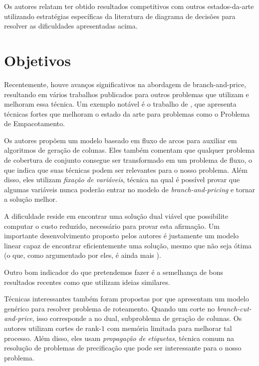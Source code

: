 \documentclass[11pt]{article}
\providecommand{\DIFaddtex}[1]{{\protect\color{blue}{#1}}} %
\providecommand{\DIFaddbegin}{} %
\providecommand{\DIFaddend}{} %
\providecommand{\DIFadd}[1]{\texorpdfstring{\DIFaddtex{#1}}{#1}} %
\newcommand{\DIFaddincludegraphics}[2][]{{\color{blue}\fbox{\DIFOincludegraphics[#1]{#2}}}} %
\DeclareRobustCommand{\DIFaddbegin}{\DIFOaddbegin \let\includegraphics\DIFaddincludegraphics} %
\DeclareRobustCommand{\DIFaddend}{\DIFOaddend \let\includegraphics\DIFOincludegraphics} %
\begin{document}
Os autores relatam ter obtido resultados competitivos com outros estados-da-arte utilizando estratégias específicas da literatura de diagrama de decisões para resolver as dificuldades apresentadas acima.

\section{Objetivos}
 \DIFaddbegin \label{sec:org966206f}
\DIFaddend Recentemente, houve avanços significativos na abordagem de branch-and-price, resultando em vários trabalhos publicados para outros problemas que utilizam e melhoram essa técnica.
Um exemplo notável é o trabalho de \textcite{Lima2022Exactsolutionnetwork}, que apresenta técnicas fortes que melhoram o estado da arte para problemas como o Problema de Empacotamento.

Os autores propõem um modelo baseado em fluxo de arcos para auxiliar em algoritmos de geração de colunas.
Eles também comentam que qualquer problema de cobertura de conjunto consegue ser transformado em um problema de fluxo, o que indica que suas técnicas podem ser relevantes para o nosso problema.
Além disso, eles utilizam \emph{fixação de variáveis}, técnica na qual é possível provar que algumas variáveis nunca poderão entrar no modelo de \emph{branch-and-pricing} e tornar a solução melhor.

A dificuldade reside em encontrar uma solução dual viável que possibilite computar o custo reduzido, necessário para provar esta afirmação.
Um importante desenvolvimento proposto pelos autores é justamente um modelo linear capaz de encontrar eficientemente uma solução, mesmo que não seja ótima (o que, como argumentado por eles, é ainda mais  \DIFaddbegin \DIFadd{eficiente}\DIFaddend ).

Outro bom indicador do que pretendemos fazer é a semelhança de bons resultados recentes como  \DIFaddbegin \DIFadd{\mbox{%
\textcite{Hoeve2021Graphcoloringdecision} }\hskip0pt%
}\DIFaddend que utilizam ideias similares.

Técnicas interessantes também foram propostas por \textcite{Pessoa2021SolvingBinPacking} que apresentam um modelo genérico para resolver problema de roteamento.
Quando  \DIFaddbegin \DIFadd{se adiciona }\DIFaddend um corte no \emph{branch-cut-and-price}, isso corresponde a \DIFaddbegin\DIFadd{adição de uma nova variável} \DIFaddend no dual, \DIFaddbegin \DIFadd{dificultando o }\DIFaddend subproblema de geração de colunas.
Os autores utilizam cortes de rank-\(1\) com memória limitada para melhorar tal processo.
Além disso, eles usam \emph{propagação de etiquetas}, técnica comum na resolução de problemas de precificação  que pode ser interessante para o nosso problema.
\end{document}
